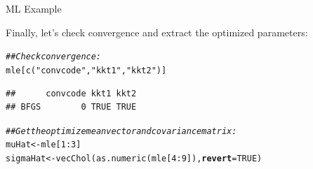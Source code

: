 \documentclass{beamer}\usepackage[]{graphicx}\usepackage[]{color}
\makeatletter
\newcommand{\hlnum}[1]{\textcolor[rgb]{0.69,0.494,0}{#1}}%
\newcommand{\hlstr}[1]{\textcolor[rgb]{0.749,0.012,0.012}{#1}}%
\newcommand{\hlcom}[1]{\textcolor[rgb]{0.514,0.506,0.514}{\textit{#1}}}%
\newcommand{\hlopt}[1]{\textcolor[rgb]{0,0,0}{#1}}%
\newcommand{\hlstd}[1]{\textcolor[rgb]{0,0,0}{#1}}%
\newcommand{\hlkwb}[1]{\textcolor[rgb]{0,0.341,0.682}{#1}}%
\newcommand{\hlkwc}[1]{\textcolor[rgb]{0,0,0}{\textbf{#1}}}%
\newcommand{\hlkwd}[1]{\textcolor[rgb]{0.004,0.004,0.506}{#1}}%
\newenvironment{kframe}{%
 \def\at@end@of@kframe{}%
 \ifinner\ifhmode%
  \def\at@end@of@kframe{\end{minipage}}%
  \begin{minipage}{\columnwidth}%
 \fi\fi%
 \def\FrameCommand##1{\hskip\@totalleftmargin \hskip-\fboxsep
 \colorbox{shadecolor}{##1}\hskip-\fboxsep
     \hskip-\linewidth \hskip-\@totalleftmargin \hskip\columnwidth}%
 \MakeFramed {\advance\hsize-\width
   \@totalleftmargin\z@ \linewidth\hsize
   \@setminipage}}%
 {\par\unskip\endMakeFramed%
 \at@end@of@kframe}
\newenvironment{knitrout}{}{} %
\makeatother
\begin{document}
\begin{frame}[fragile]{ML Example}
  
  Finally, let's check convergence and extract the optimized parameters:
  
\begin{knitrout}\footnotesize
{}\color{fgcolor}\begin{kframe}
\begin{alltt}
\hlcom{## Check convergence:}
\hlstd{mle[}\hlkwd{c}\hlstd{(}\hlstr{"convcode"}\hlstd{,} \hlstr{"kkt1"}\hlstd{,} \hlstr{"kkt2"}\hlstd{)]}
\end{alltt}
\begin{verbatim}
##      convcode kkt1 kkt2
## BFGS        0 TRUE TRUE
\end{verbatim}
\begin{alltt}
\hlcom{## Get the optimize mean vector and covariance matrix:}
\hlstd{muHat}    \hlkwb{<-} \hlstd{mle[}\hlnum{1} \hlopt{:} \hlnum{3}\hlstd{]}
\hlstd{sigmaHat} \hlkwb{<-} \hlkwd{vecChol}\hlstd{(}\hlkwd{as.numeric}\hlstd{(mle[}\hlnum{4} \hlopt{:} \hlnum{9}\hlstd{]),} \hlkwc{revert} \hlstd{=} \hlnum{TRUE}\hlstd{)}
\end{alltt}
\end{kframe}
\end{knitrout}

\end{frame}

\end{document}
